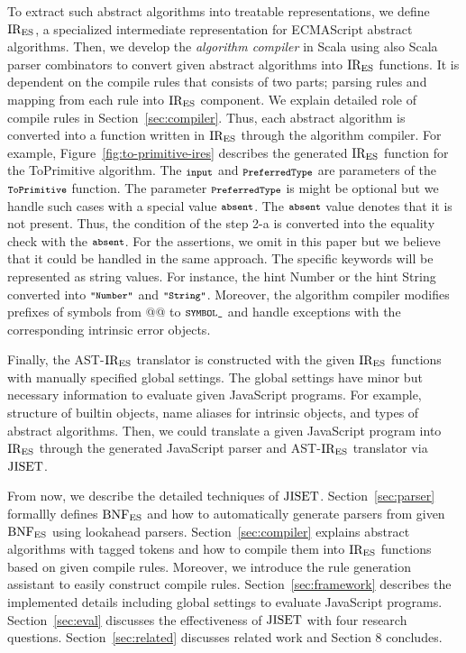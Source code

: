 To extract such abstract algorithms into treatable representations,
we define \( \text{IR}_\text{ES} \), a specialized intermediate representation
for ECMAScript abstract algorithms. Then, we develop the \textit{algorithm compiler}
in Scala using also Scala parser combinators to convert given abstract algorithms
into \( \text{IR}_\text{ES} \) functions. It is dependent on the compile rules that consists of two parts;
parsing rules and mapping from each rule into \( \text{IR}_\text{ES} \) component.
We explain detailed role of compile rules in Section~\ref{sec:compiler}.
Thus, each abstract algorithm is converted into a function written in \( \text{IR}_\text{ES} \)
through the algorithm compiler. For example, Figure~\ref{fig:to-primitive-ires}
describes the generated \( \text{IR}_\text{ES} \) function for the ToPrimitive
algorithm. The \( \texttt{\footnotesize input} \) and \( \texttt{\footnotesize PreferredType} \) are parameters
of the \( \texttt{\footnotesize ToPrimitive} \) function. The parameter \( \texttt{\footnotesize PreferredType} \)
is might be optional but we handle such cases with a special value \( \texttt{\footnotesize absent} \).
The \( \texttt{\footnotesize absent} \) value denotes that it is not present.
Thus, the condition of the step 2-a is converted into
the equality check with the \( \texttt{\footnotesize absent} \).
For the assertions, we omit in this paper but we believe that it could be handled in
the same approach. The specific keywords will be represented as string values.
For instance, the hint Number or the hint String converted into \( \texttt{\footnotesize"Number"} \)
and \( \texttt{\footnotesize"String"} \). Moreover, the algorithm compiler modifies prefixes of
symbols from @@ to \( \texttt{\footnotesize SYMBOL\_} \) and handle exceptions with the corresponding
intrinsic error objects.

Finally, the AST-\( \text{IR}_\text{ES} \) translator is constructed with the given \( \text{IR}_\text{ES} \)
functions with manually specified global settings. The global settings have
minor but necessary information to evaluate given JavaScript programs.
For example, structure of builtin objects, name aliases for intrinsic objects,
and types of abstract algorithms. Then, we could translate a given JavaScript program
into \( \text{IR}_\text{ES} \) through the generated JavaScript parser and AST-\( \text{IR}_\text{ES} \) translator
via \( \text{JISET} \).

From now, we describe the detailed techniques of \( \text{JISET} \).
Section~\ref{sec:parser} formallly defines \( \text{BNF}_{\text{ES}} \) and how to automatically
generate parsers from given \( \text{BNF}_{\text{ES}} \) using lookahead parsers.
Section~\ref{sec:compiler} explains abstract algorithms with tagged tokens
and how to compile them into \( \text{IR}_\text{ES} \) functions based on
given compile rules. Moreover, we introduce the rule generation assistant
to easily construct compile rules. Section~\ref{sec:framework} describes
the implemented details including global settings to evaluate JavaScript programs.
Section~\ref{sec:eval} discusses the effectiveness of \( \text{JISET} \) with
four research questions.
Section~\ref{sec:related} discusses related work and Section 8 concludes.
